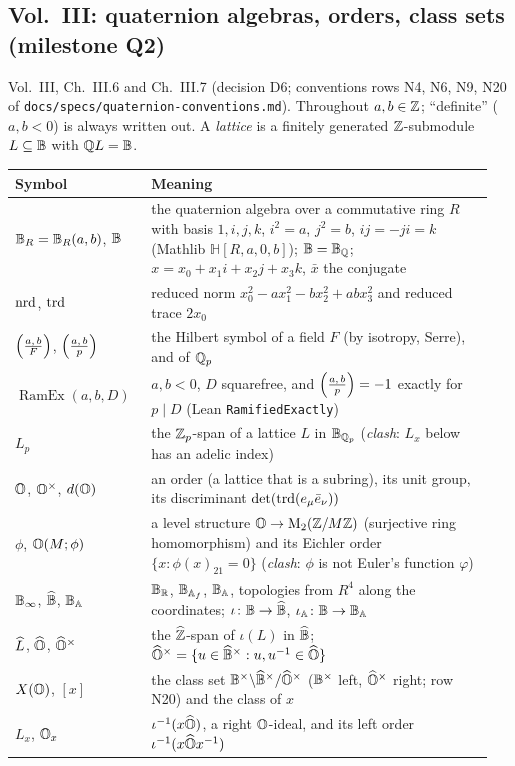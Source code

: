 \subsection*{Vol.~III: quaternion algebras, orders, class sets (milestone Q2)}\label{notation:q2}
Vol.~III, Ch.~III.6 and Ch.~III.7 (decision D6; conventions rows N4, N6, N9, N20 of \texttt{docs/specs/quaternion-conventions.md}). Throughout
$a,b\in\mathbb{Z}$; ``definite'' ($a,b<0$) is always written out. A \emph{lattice} is a finitely generated $\mathbb{Z}$-submodule $L\subseteq\mathbb{B}$ with $\mathbb{Q} L=\mathbb{B}$.
\begin{longtable}{@{}p{0.27\linewidth}p{0.68\linewidth}@{}}
\toprule
Symbol & Meaning \\ \midrule
\endhead
$\mathbb{B}_R=\mathbb{B}_R(a,b)$, $\mathbb{B}$ & the quaternion algebra over a commutative ring $R$ with basis $1,i,j,k$, $i^2=a$, $j^2=b$, $ij=-ji=k$ (Mathlib $\mathbb H[R,a,0,b]$);
  $\mathbb{B}=\mathbb{B}_{\mathbb{Q}}$; $x=x_0+x_1i+x_2j+x_3k$, $\bar x$ the conjugate \\
$\operatorname{nrd}$, $\operatorname{trd}$ & reduced norm $x_0^2-ax_1^2-bx_2^2+abx_3^2$ and reduced trace $2x_0$ \\
$\Bigl(\tfrac{a,\,b}{F}\Bigr)$, $\Bigl(\tfrac{a,\,b}{p}\Bigr)$ & the Hilbert symbol of a field $F$ (by isotropy, Serre), and of $\mathbb{Q}_p$ \\
$\operatorname{RamEx}(a,b,D)$ & $a,b<0$, $D$ squarefree, and $\Bigl(\tfrac{a,\,b}{p}\Bigr)=-1$ exactly for $p\mid D$ (Lean \texttt{RamifiedExactly}) \\
$L_p$ & the $\mathbb{Z}_p$-span of a lattice $L$ in $\mathbb{B}_{\mathbb{Q}_p}$ (\emph{clash}: $L_x$ below has an adelic index) \\
$\mathbb{O}$, $\mathbb{O}^\times$, $d(\mathbb{O})$ & an order (a lattice that is a subring), its unit group, its discriminant $\det(\operatorname{trd}(e_\mu\bar e_\nu))$ \\
$\phi$, $\mathbb{O}(M;\phi)$ & a level structure $\mathbb{O}\to\mathrm{M}_2(\mathbb{Z}/M\mathbb{Z})$ (surjective ring homomorphism) and its Eichler order $\{x:\phi(x)_{21}=0\}$
  (\emph{clash}: $\phi$ is not Euler's function $\varphi$) \\
$\mathbb{B}_{\infty}$, $\widehat{\mathbb{B}}$, $\mathbb{B}_{\mathbb{A}}$ & $\mathbb{B}_{\mathbb{R}}$, $\mathbb{B}_{\mathbb{A}_f}$, $\mathbb{B}_{\mathbb{A}}$, topologies from $R^4$ along the coordinates; $\iota\colon\mathbb{B}\to\widehat{\mathbb{B}}$, $\iota_{\mathbb{A}}\colon\mathbb{B}\to\mathbb{B}_{\mathbb{A}}$ \\
$\widehat{L}$, $\widehat{\mathbb{O}}$, $\widehat{\mathbb{O}}^\times$ & the $\widehat{\mathbb{Z}}$-span of $\iota(L)$ in $\widehat{\mathbb{B}}$; $\widehat{\mathbb{O}}^\times=\{u\in\widehat{\mathbb{B}}^\times:u,u^{-1}\in\widehat{\mathbb{O}}\}$ \\
$X(\mathbb{O})$, $[x]$ & the class set $\mathbb{B}^\times\backslash\widehat{\mathbb{B}}^\times/\widehat{\mathbb{O}}^\times$ ($\mathbb{B}^\times$ left, $\widehat{\mathbb{O}}^\times$ right; row N20) and the class of $x$ \\
$L_x$, $\mathbb{O}_x$ & $\iota^{-1}(x\widehat{\mathbb{O}})$, a right $\mathbb{O}$-ideal, and its left order $\iota^{-1}(x\widehat{\mathbb{O}} x^{-1})$ \\

\end{longtable}
